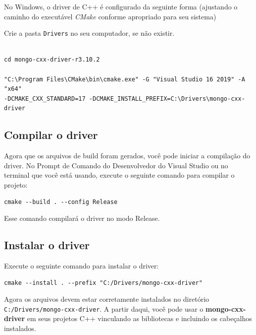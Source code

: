 \documentclass[a4paper,11pt]{article}
\newcommand{\cmake}{\textit{CMake}}
\newcommand{\mongo}{\textit{MongoDB}}
\begin{document}
No Windows, o driver de C++ é configurado da seguinte forma (ajustando o caminho do executável \cmake{} conforme apropriado para seu sistema)

Crie a pasta {\tt Drivers} no seu computador, se não existir.

\begin{mdframed}
	\begin{verbatim}
		
cd mongo-cxx-driver-r3.10.2
		
"C:\Program Files\CMake\bin\cmake.exe" -G "Visual Studio 16 2019" -A "x64"
-DCMAKE_CXX_STANDARD=17 -DCMAKE_INSTALL_PREFIX=C:\Drivers\mongo-cxx-driver
	\end{verbatim}
\end{mdframed}

\subsection*{Compilar o driver}

Agora que os arquivos de build foram gerados, você pode iniciar a compilação do driver. No Prompt de Comando do Desenvolvedor do Visual Studio ou no terminal que você está usando, execute o seguinte comando para compilar o projeto:

\begin{mdframed}
	\begin{verbatim}
cmake --build . --config Release
	\end{verbatim}
\end{mdframed}

Esse comando compilará o driver no modo Release.

\subsection*{Instalar o driver}

Execute o seguinte comando para instalar o driver:
\begin{mdframed}
	\begin{verbatim}
cmake --install . --prefix "C:/Drivers/mongo-cxx-driver"
	\end{verbatim}
\end{mdframed}

Agora os arquivos devem estar corretamente instalados no diretório {\tt C:/Drivers/mongo-cxx-driver}. A partir daqui, você pode usar o \textbf{mongo-cxx-driver} em seus projetos C++ vinculando as bibliotecas e incluindo os cabeçalhos instalados.
\end{document}
